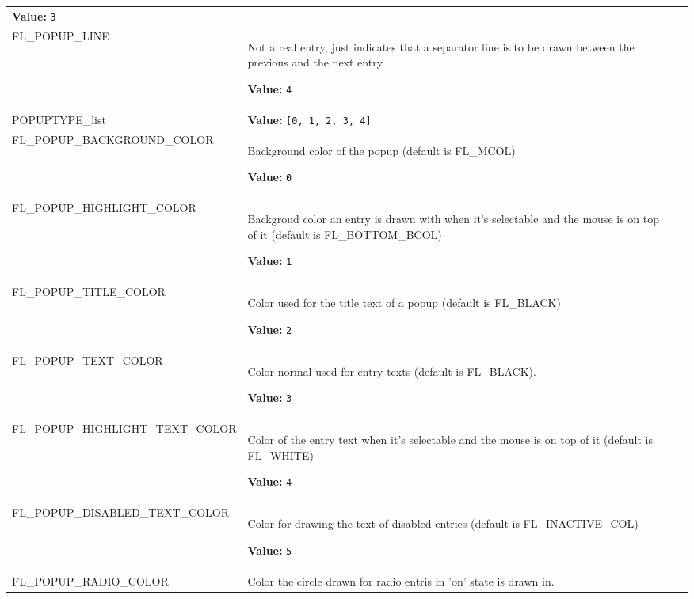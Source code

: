 \begin{longtable}{|p{\varnamewidth}|p{\vardescrwidth}|l}
\textbf{Value:} 
{\tt 3}&\\
\cline{1-2}
\raggedright F\-L\-\_\-P\-O\-P\-U\-P\-\_\-L\-I\-N\-E\- & \raggedright Not a real entry, just indicates that a separator line is to be drawn
between the previous and the next entry.

\textbf{Value:} 
{\tt 4}&\\
\cline{1-2}
\raggedright P\-O\-P\-U\-P\-T\-Y\-P\-E\-\_\-l\-i\-s\-t\- & \raggedright \textbf{Value:} 
{\tt \texttt{[}0\texttt{, }1\texttt{, }2\texttt{, }3\texttt{, }4\texttt{]}}&\\
\cline{1-2}
\raggedright F\-L\-\_\-P\-O\-P\-U\-P\-\_\-B\-A\-C\-K\-G\-R\-O\-U\-N\-D\-\_\-C\-O\-L\-O\-R\- & \raggedright Background color of the popup (default is FL\_MCOL)

\textbf{Value:} 
{\tt 0}&\\
\cline{1-2}
\raggedright F\-L\-\_\-P\-O\-P\-U\-P\-\_\-H\-I\-G\-H\-L\-I\-G\-H\-T\-\_\-C\-O\-L\-O\-R\- & \raggedright Backgroud color an entry is drawn with when it's selectable and the
mouse is on top of it (default is FL\_BOTTOM\_BCOL)

\textbf{Value:} 
{\tt 1}&\\
\cline{1-2}
\raggedright F\-L\-\_\-P\-O\-P\-U\-P\-\_\-T\-I\-T\-L\-E\-\_\-C\-O\-L\-O\-R\- & \raggedright Color used for the title text of a popup (default is FL\_BLACK)

\textbf{Value:} 
{\tt 2}&\\
\cline{1-2}
\raggedright F\-L\-\_\-P\-O\-P\-U\-P\-\_\-T\-E\-X\-T\-\_\-C\-O\-L\-O\-R\- & \raggedright Color normal used for entry texts (default is FL\_BLACK).

\textbf{Value:} 
{\tt 3}&\\
\cline{1-2}
\raggedright F\-L\-\_\-P\-O\-P\-U\-P\-\_\-H\-I\-G\-H\-L\-I\-G\-H\-T\-\_\-T\-E\-X\-T\-\_\-C\-O\-L\-O\-R\- & \raggedright Color of the entry text when it's selectable and the mouse is on
top of it (default is FL\_WHITE)

\textbf{Value:} 
{\tt 4}&\\
\cline{1-2}
\raggedright F\-L\-\_\-P\-O\-P\-U\-P\-\_\-D\-I\-S\-A\-B\-L\-E\-D\-\_\-T\-E\-X\-T\-\_\-C\-O\-L\-O\-R\- & \raggedright Color for drawing the text of disabled entries (default is
FL\_INACTIVE\_COL)

\textbf{Value:} 
{\tt 5}&\\
\cline{1-2}
\raggedright F\-L\-\_\-P\-O\-P\-U\-P\-\_\-R\-A\-D\-I\-O\-\_\-C\-O\-L\-O\-R\- & \raggedright Color the circle drawn for radio entris in 'on' state is drawn in.


\end{longtable}
